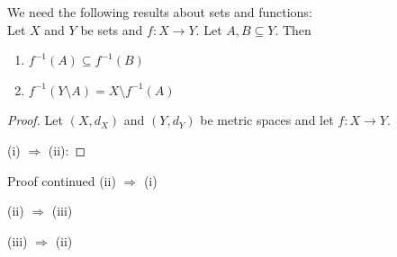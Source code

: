 \documentclass [aspectratio=169]{beamer}
\newcommand{\inv}{{-1}}
\begin{document}
\begin{frame}
We need the following results about sets and functions: \\
Let $X$ and $Y$ be sets and $f:X \to Y$. Let $A,B \subseteq Y$. Then 
\begin{enumerate}
\item $f^\inv(A) \subseteq f^\inv(B)$
\item $f^\inv(Y \setminus A) = X \setminus f^\inv(A)$
\end{enumerate}

\begin{proof}
Let $(X,d_X)$ and $(Y,d_Y)$ be metric spaces and let $f:X\to Y$.

(i) $\Rightarrow$ (ii): 

\vspace{3cm}


\end{proof}

\end{frame}


\begin{frame}

\begin{block}{Proof continued}
(ii) $\Rightarrow$ (i)

\vspace{3cm}
(ii) $\Rightarrow$ (iii)

\vspace{1cm}
(iii) $\Rightarrow$ (ii) 
\vspace{0.5cm}
\end{block}
\end{frame}



\begin{frame}

\end{frame}


\begin{frame}

\end{frame}


\begin{frame}

\end{frame}
\end{document}
